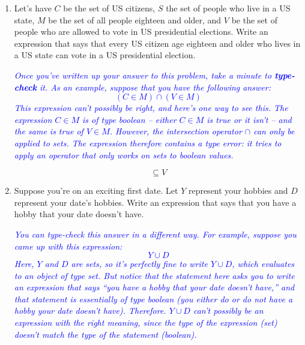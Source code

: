 \documentclass{article}
\renewcommand{\(}{\left(}
\renewcommand{\)}{\right)}
\theoremstyle{plain}
\theoremstyle{plain}
\theoremstyle{definition}
\begin{document}
\begin{enumerate}[label*=\roman*.,ref=\roman*]

\item Let's have $C$ be the set of US citizens, $S$ the set of people who live in a US state, $M$ be the set of
all people eighteen and older, and $V$ be the set of people who are allowed to vote in US presidential
elections. Write an expression that says that every US citizen age eighteen and older who
lives in a US state can vote in a US presidential election.

\textit{\textcolor{blue}{Once you've written up your answer to this problem, take a minute to \textbf{type-check} it. As an example, suppose
that you have the following answer: 
\begin{equation*}
(C \in M) \cap (V \in M)
\end{equation*}
This expression can't possibly be right, and here's one way to see this. The expression $C \in M$ is of type
boolean -- either $C \in M$ is true or it isn't -- and the same is true of $V \in M$. However, the intersection operator
$\cap$ can only be applied to sets. The expression therefore contains a type error: it tries to apply an operator that only works on sets to boolean values. }}

\begin{shaded}
\begin{equation*}
	[(C \cap M) \cap S] \subseteq V
\end{equation*}
\end{shaded}

\item Suppose you're on an exciting first date. Let $Y$ represent your hobbies and $D$ represent your
date's hobbies. Write an expression that says that you have a hobby that your date doesn't have.

\textit{\textcolor{blue}{You can type-check this answer in a different way. For example, suppose you came up with this expression:
\begin{equation*}
Y \cup D
\end{equation*}
Here, $Y$ and $D$ are sets, so it's perfectly fine to write $Y \cup D$, which evaluates to an object of type set. But
notice that the statement here asks you to write an expression that says ``you have a hobby that your date
doesn't have,'' and that statement is essentially of type boolean (you either do or do not have a hobby your
date doesn't have). Therefore. $Y \cup D$ can't possibly be an expression with the right meaning, since the type
of the expression (set) doesn't match the type of the statement (boolean). }}


\end{enumerate}
\end{document}
